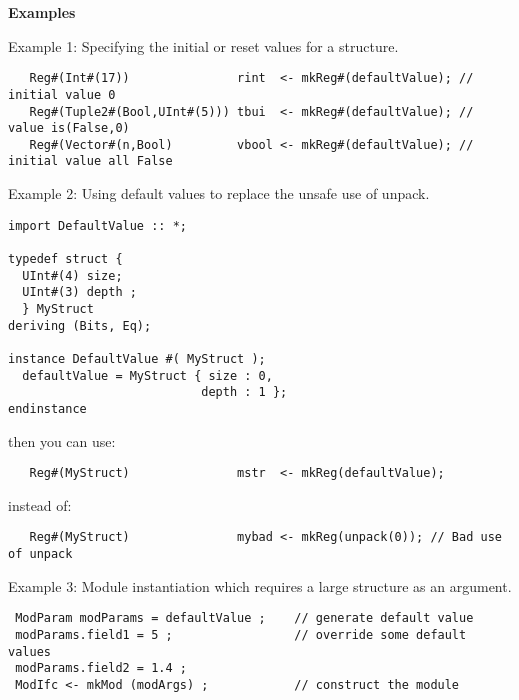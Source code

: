 {\bf Examples}

Example 1: Specifying the initial or reset values for a structure.
\begin{verbatim}
   Reg#(Int#(17))               rint  <- mkReg#(defaultValue); // initial value 0
   Reg#(Tuple2#(Bool,UInt#(5))) tbui  <- mkReg#(defaultValue); // value is(False,0)
   Reg#(Vector#(n,Bool)         vbool <- mkReg#(defaultValue); // initial value all False
\end{verbatim}

Example 2: Using default values to replace the unsafe use of unpack. 
\begin{verbatim}
import DefaultValue :: *;

typedef struct {
  UInt#(4) size;
  UInt#(3) depth ;
  } MyStruct
deriving (Bits, Eq);

instance DefaultValue #( MyStruct );
  defaultValue = MyStruct { size : 0,
                           depth : 1 };
endinstance
\end{verbatim}
then you can use:
\begin{verbatim}
   Reg#(MyStruct)               mstr  <- mkReg(defaultValue);  
\end{verbatim}
instead of:
\begin{verbatim}
   Reg#(MyStruct)               mybad <- mkReg(unpack(0)); // Bad use of unpack
\end{verbatim}

Example 3: Module instantiation which requires a large
structure as an argument.
\begin{verbatim}
 ModParam modParams = defaultValue ;    // generate default value
 modParams.field1 = 5 ;                 // override some default values
 modParams.field2 = 1.4 ;     
 ModIfc <- mkMod (modArgs) ;            // construct the module
\end{verbatim}

